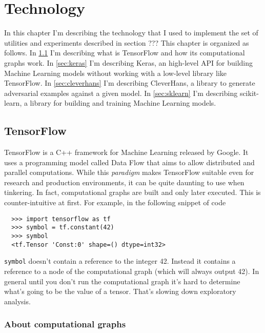 \chapter{Technology}

In this chapter I'm describing the technology that I used to implement
the set of utilities and experiments described in section ??? This
chapter is organized as follows. In \ref{sec:tensorflow} I'm describing
what is TensorFlow and how its computational graphs work. In
\ref{sec:keras} I'm describing Keras, an high-level API for building
Machine Learning models without working with a low-level library like
TensorFlow. In \ref{sec:cleverhans} I'm describing CleverHans, a
library to generate adversarial examples against a given model. In
\ref{sec:sklearn} I'm describing scikit-learn, a library for building
and training Machine Learning models.

\section{TensorFlow}
\label{sec:tensorflow}

TensorFlow is a C++ framework for Machine Learning released by Google.
It uses a programming model called Data Flow that aims to allow
distributed and parallel computations. While this \emph{paradigm} makes
TensorFlow suitable even for research and production environments, it
can be quite daunting to use when tinkering. In fact, computational
graphs are built and only later executed. This is counter-intuitive at
first. For example, in the following snippet of code

\begin{verbatim}
  >>> import tensorflow as tf
  >>> symbol = tf.constant(42)
  >>> symbol 
  <tf.Tensor 'Const:0' shape=() dtype=int32>
\end{verbatim}

\texttt{symbol} doesn't contain a reference to the integer 42. Instead
it contains a reference to a node of the computational graph (which
will always output 42). In general until you don't run the
computational graph it's hard to determine what's going to be the value
of a tensor. That's slowing down exploratory analysis.

\subsection{About computational graphs}
\label{subsec:computational-graph}

